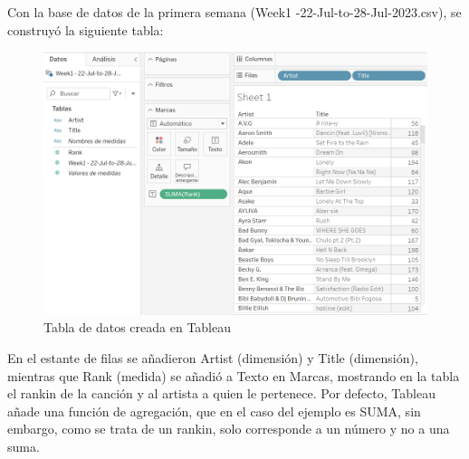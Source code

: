 \documentclass[a4paper, 12pt]{book}
\begin{document}
Con la base de datos de la primera semana (Week1 -22-Jul-to-28-Jul-2023.csv), se construyó la siguiente tabla:
\begin{figure}[H] 
	\centering 
	\includegraphics[width=0.9\linewidth]{tabla1.png}
	\caption{Tabla de datos creada en Tableau}
\end{figure}
En el estante de filas se añadieron Artist (dimensión) y Title (dimensión), mientras que Rank (medida) se añadió a Texto en Marcas, mostrando en la tabla el rankin de la canción y al artista a quien le pertenece. Por defecto, Tableau añade una función de agregación, que en el caso del ejemplo es SUMA, sin embargo, como se trata de un rankin, solo corresponde a un número y no a una suma.
\end{document}
